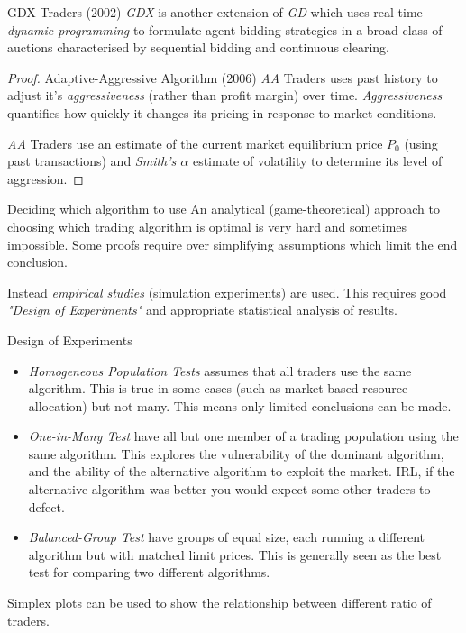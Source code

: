 \documentclass[11pt,a4paper]{article}
\begin{document}
  \begin{proposition}{GDX Traders (2002)}
    \textit{GDX} is another extension of \textit{GD} which uses real-time \textit{dynamic programming} to formulate agent bidding strategies in a broad class of auctions characterised by sequential bidding and continuous clearing.
  \end{proposition}

  \begin{proof}{Adaptive-Aggressive Algorithm (2006)}
    \textit{AA} Traders uses past history to adjust it's \textit{aggressiveness} (rather than profit margin) over time. \textit{Aggressiveness} quantifies how quickly it changes its pricing in response to market conditions.
    \par \textit{AA} Traders use an estimate of the current market equilibrium price $P_0$ (using past transactions) and \textit{Smith's $\alpha$} estimate of volatility to determine its level of aggression.
  \end{proof}

  \begin{proposition}{Deciding which algorithm to use}
    An analytical (game-theoretical) approach to choosing which trading algorithm is optimal is very hard and sometimes impossible. Some proofs require over simplifying assumptions which limit the end conclusion.
    \par Instead \textit{empirical studies} (simulation experiments) are used. This requires good \textit{"Design of Experiments"} and appropriate statistical analysis of results.
  \end{proposition}

  \begin{proposition}{Design of Experiments}
    \begin{itemize}
      \item \textit{Homogeneous Population Tests} assumes that all traders use the same algorithm. This is true in some cases (such as market-based resource allocation) but not many. This means only limited conclusions can be made.
      \item \textit{One-in-Many Test} have all but one member of a trading population using the same algorithm. This explores the vulnerability of the dominant algorithm, and the ability of the alternative algorithm to exploit the market. IRL, if the alternative algorithm was better you would expect some other traders to defect.
      \item \textit{Balanced-Group Test} have groups of equal size, each running a different algorithm but with matched limit prices. This is generally seen as the best test for comparing two different algorithms.
    \end{itemize}
    Simplex plots can be used to show the relationship between different ratio of traders.
  \end{proposition}
\end{document}

